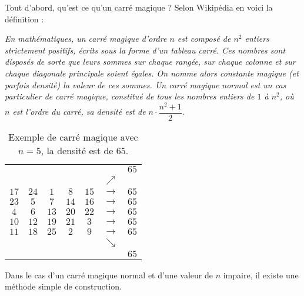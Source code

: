 
Tout d'abord, qu'est ce qu'un carré magique ? Selon Wikipédia en voici la définition :
\begin{table}[htbp]
\begin{minipage}{0.5\textwidth}
\textsl{\og En mathématiques, un carré magique d'ordre $n$ est composé de $n^2$ entiers strictement positifs, écrits sous la forme d'un tableau carré. Ces nombres sont disposés de sorte que leurs sommes sur chaque rangée, sur chaque colonne et sur chaque diagonale principale soient égales. On nomme alors constante magique (et parfois densité) la valeur de ces sommes. Un carré magique normal est un cas particulier de carré magique, constitué de tous les nombres entiers de $1$ à $n^2$, où $n$ est l'ordre du carré, sa densité est de $n\cdot\dfrac{n^2+1}{2}$.\fg}
\end{minipage}
\begin{minipage}{0.5\textwidth}
\renewcommand{\arraystretch}{1.5}

	\centering
		\begin{tabular}{|*{5}{c|}cc}
			\multicolumn{6}{r}{}                &$65$\\
		  \multicolumn{6}{r}{$\nearrow$}      &   \\
			\cline{1-5}
			$17$&$24$&$1$&$8$&$15$&$\rightarrow$&$65$\\
			\cline{1-5}
			$23$&$5$&$7$&$14$&$16$&$\rightarrow$&$65$\\
			\cline{1-5}
			$4$&$6$&$13$&$20$&$22$&$\rightarrow$&$65$\\
			\cline{1-5}
			$10$&$12$&$19$&$21$&$3$&$\rightarrow$&$65$\\
			\cline{1-5}
			$11$&$18$&$25$&$2$&$9$&$\rightarrow$&$65$\\
			\cline{1-5}
			\multicolumn{6}{r}{$\searrow$}      &   \\
			\multicolumn{6}{r}{}                &$65$\\
		  
		\end{tabular}
		\caption{Exemple de carré magique avec $n=5$, la densité est de $65$.}
\end{minipage}
\end{table}
\renewcommand{\arraystretch}{1}



Dans le cas d'un carré magique normal et d'une valeur de $n$ impaire, il existe une méthode simple de construction.

